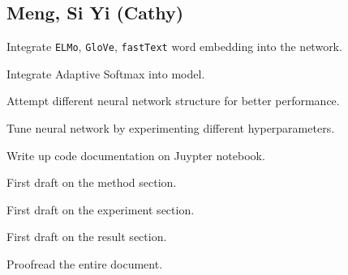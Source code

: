 \begin{appendices}
\section{Meng, Si Yi (Cathy) }
\begin{compactitem}
\item Integrate \texttt{ELMo}, \texttt{GloVe}, \texttt{fastText} word embedding into the network.
\item Integrate Adaptive Softmax into model.
\item Attempt different neural network structure for better performance.
\item Tune neural network by experimenting different hyperparameters.
\item Write up code documentation on Juypter notebook.
\item First draft on the method section.
\item First draft on the experiment section.
\item First draft on the result section.
\item Proofread the entire document.
\end{compactitem}
\end{appendices}